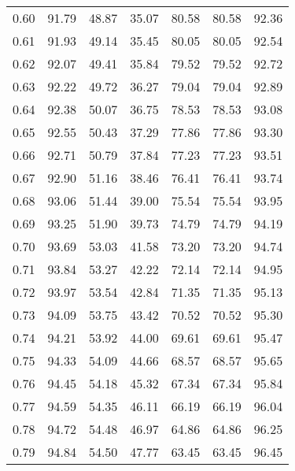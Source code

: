 \begin{tabular}{|c|c|c|c|c|c|c|}
      0.60 &     91.79 &     48.87 &      35.07 &   80.58 &      80.58 &         92.36 \\
      0.61 &     91.93 &     49.14 &      35.45 &   80.05 &      80.05 &         92.54 \\
      0.62 &     92.07 &     49.41 &      35.84 &   79.52 &      79.52 &         92.72 \\
      0.63 &     92.22 &     49.72 &      36.27 &   79.04 &      79.04 &         92.89 \\
      0.64 &     92.38 &     50.07 &      36.75 &   78.53 &      78.53 &         93.08 \\
      0.65 &     92.55 &     50.43 &      37.29 &   77.86 &      77.86 &         93.30 \\
      0.66 &     92.71 &     50.79 &      37.84 &   77.23 &      77.23 &         93.51 \\
      0.67 &     92.90 &     51.16 &      38.46 &   76.41 &      76.41 &         93.74 \\
      0.68 &     93.06 &     51.44 &      39.00 &   75.54 &      75.54 &         93.95 \\
      0.69 &     93.25 &     51.90 &      39.73 &   74.79 &      74.79 &         94.19 \\
      0.70 &     93.69 &     53.03 &      41.58 &   73.20 &      73.20 &         94.74 \\
      0.71 &     93.84 &     53.27 &      42.22 &   72.14 &      72.14 &         94.95 \\
      0.72 &     93.97 &     53.54 &      42.84 &   71.35 &      71.35 &         95.13 \\
      0.73 &     94.09 &     53.75 &      43.42 &   70.52 &      70.52 &         95.30 \\
      0.74 &     94.21 &     53.92 &      44.00 &   69.61 &      69.61 &         95.47 \\
      0.75 &     94.33 &     54.09 &      44.66 &   68.57 &      68.57 &         95.65 \\
      0.76 &     94.45 &     54.18 &      45.32 &   67.34 &      67.34 &         95.84 \\
      0.77 &     94.59 &     54.35 &      46.11 &   66.19 &      66.19 &         96.04 \\
      0.78 &     94.72 &     54.48 &      46.97 &   64.86 &      64.86 &         96.25 \\
      0.79 &     94.84 &     54.50 &      47.77 &   63.45 &      63.45 &         96.45 \\

\end{tabular}
